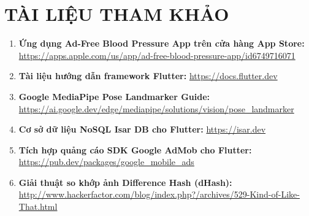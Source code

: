 \documentclass[12pt, a4paper]{article}
\begin{document}
\newpage
\section{TÀI LIỆU THAM KHẢO}
\begin{enumerate}
    \item \textbf{Ứng dụng Ad-Free Blood Pressure App trên cửa hàng App Store:} \url{https://apps.apple.com/us/app/ad-free-blood-pressure-app/id6749716071}
    \item \textbf{Tài liệu hướng dẫn framework Flutter:} \url{https://docs.flutter.dev}
    \item \textbf{Google MediaPipe Pose Landmarker Guide:} \url{https://ai.google.dev/edge/mediapipe/solutions/vision/pose_landmarker}
    \item \textbf{Cơ sở dữ liệu NoSQL Isar DB cho Flutter:} \url{https://isar.dev}
    \item \textbf{Tích hợp quảng cáo SDK Google AdMob cho Flutter:} \url{https://pub.dev/packages/google_mobile_ads}
    \item \textbf{Giải thuật so khớp ảnh Difference Hash (dHash):} \url{http://www.hackerfactor.com/blog/index.php?/archives/529-Kind-of-Like-That.html}
\end{enumerate}
\end{document}
